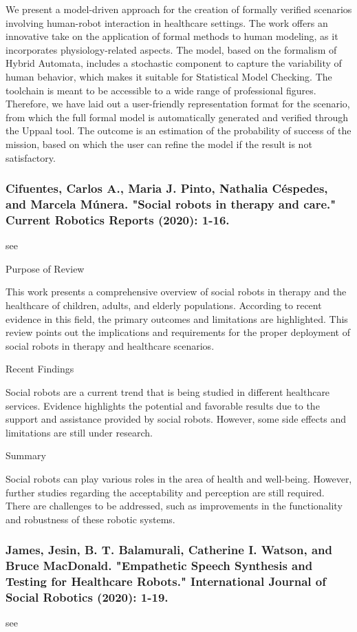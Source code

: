\documentclass[conference]{IEEEtran}
\begin{document}
We present a model-driven approach for the creation of formally verified scenarios involving human-robot interaction in healthcare settings. The work offers an innovative take on the application of formal methods to human modeling, as it incorporates physiology-related aspects. The model, based on the formalism of Hybrid Automata, includes a stochastic component to capture the variability of human behavior, which makes it suitable for Statistical Model Checking. The toolchain is meant to be accessible to a wide range of professional figures. Therefore, we have laid out a user-friendly representation format for the scenario, from which the full formal model is automatically generated and verified through the Uppaal tool. The outcome is an estimation of the probability of success of the mission, based on which the user can refine the model if the result is not satisfactory.

\medskip
\subsubsection{Cifuentes, Carlos A., Maria J. Pinto, Nathalia Céspedes, and Marcela Múnera. "Social robots in therapy and care." Current Robotics Reports (2020): 1-16.}
see \cite{cifuentes2020social}

Purpose of Review

This work presents a comprehensive overview of social robots in therapy and the healthcare of children, adults, and elderly populations. According to recent evidence in this field, the primary outcomes and limitations are highlighted. This review points out the implications and requirements for the proper deployment of social robots in therapy and healthcare scenarios.

Recent Findings

Social robots are a current trend that is being studied in different healthcare services. Evidence highlights the potential and favorable results due to the support and assistance provided by social robots. However, some side effects and limitations are still under research.

Summary

Social robots can play various roles in the area of health and well-being. However, further studies regarding the acceptability and perception are still required. There are challenges to be addressed, such as improvements in the functionality and robustness of these robotic systems.

\medskip
\subsubsection{James, Jesin, B. T. Balamurali, Catherine I. Watson, and Bruce MacDonald. "Empathetic Speech Synthesis and Testing for Healthcare Robots." International Journal of Social Robotics (2020): 1-19.}
see \cite{james2020empathetic}
\end{document}
